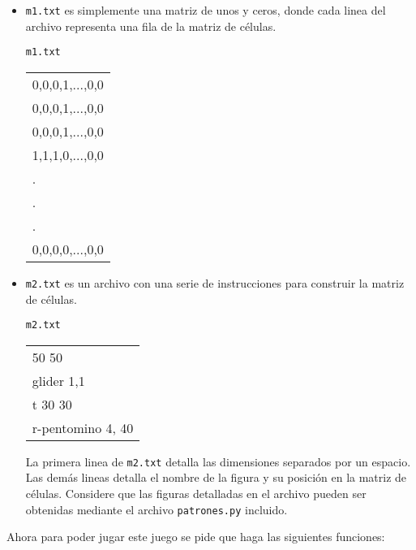 \begin{itemize}
    \item \texttt{m1.txt} es simplemente una matriz de unos y ceros, donde cada linea del archivo representa una fila de la matriz de células.
    
    \begin{center}
        \texttt{m1.txt} \\
    	\begin{tabular}{|l|}
    		\hline
            0,0,0,1,...,0,0\\
            0,0,0,1,...,0,0\\
            0,0,0,1,...,0,0\\
            1,1,1,0,...,0,0\\
            .\\
            .\\
            .\\
            0,0,0,0,...,0,0\\
    		\hline
    	\end{tabular}
    \end{center}
    
    \item \texttt{m2.txt} es un archivo con una serie de instrucciones para construir la matriz de células.
    
    \begin{center}
        \texttt{m2.txt} \\
    	\begin{tabular}{|l|}
    		\hline
            50 50\\
            glider 1,1\\
            t 30 30\\
            r-pentomino 4, 40\\
    		\hline
    	\end{tabular}
    \end{center}
    
    La primera linea de \texttt{m2.txt} detalla las dimensiones separados por un espacio.
    Las demás lineas detalla el nombre de la figura y su posición en la matriz de células.
    Considere que las figuras detalladas en el archivo pueden ser obtenidas mediante el archivo \texttt{patrones.py} incluido.
\end{itemize}

Ahora para poder jugar este juego se pide que haga las siguientes funciones:

